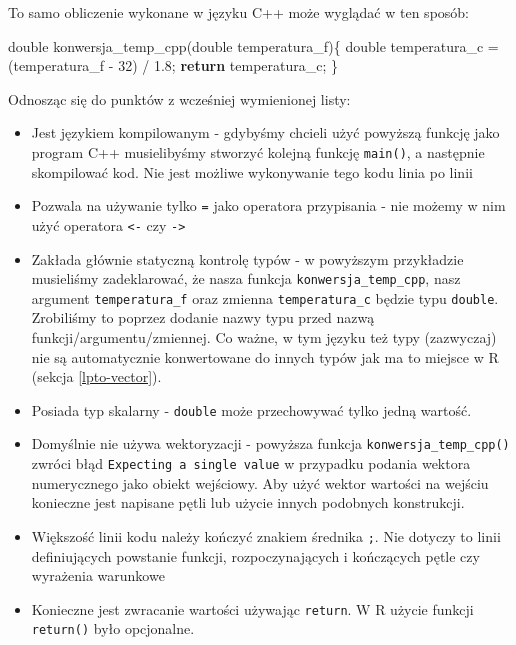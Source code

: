 \documentclass[paper=6in:9in,pagesize=pdftex,headinclude=on,footinclude=on,10pt]{scrbook}
\newenvironment{Shaded}{\begin{snugshade}}{\end{snugshade}}
\newcommand{\ControlFlowTok}[1]{\textcolor[rgb]{0.13,0.29,0.53}{\textbf{#1}}}
\newcommand{\DataTypeTok}[1]{\textcolor[rgb]{0.13,0.29,0.53}{#1}}
\newcommand{\DecValTok}[1]{\textcolor[rgb]{0.00,0.00,0.81}{#1}}
\newcommand{\FloatTok}[1]{\textcolor[rgb]{0.00,0.00,0.81}{#1}}
\newcommand{\NormalTok}[1]{#1}
\providecommand{\tightlist}{%
  \setlength{\itemsep}{0pt}\setlength{\parskip}{0pt}}
\begin{document}
To samo obliczenie wykonane w języku C++ może wyglądać w ten sposób:

\begin{Shaded}
\begin{Highlighting}[]
\DataTypeTok{double}\NormalTok{ konwersja_temp_cpp(}\DataTypeTok{double}\NormalTok{ temperatura_f)\{}
  \DataTypeTok{double}\NormalTok{ temperatura_c = (temperatura_f - }\DecValTok{32}\NormalTok{) / }\FloatTok{1.8}\NormalTok{;}
  \ControlFlowTok{return}\NormalTok{ temperatura_c;}
\NormalTok{\}}
\end{Highlighting}
\end{Shaded}

Odnosząc się do punktów z wcześniej wymienionej listy:

\begin{itemize}
\tightlist
\item
  Jest językiem kompilowanym - gdybyśmy chcieli użyć powyższą funkcję jako program C++ musielibyśmy stworzyć kolejną funkcję \texttt{main()}, a następnie skompilować kod.
  Nie jest możliwe wykonywanie tego kodu linia po linii
\item
  Pozwala na używanie tylko \texttt{=} jako operatora przypisania - nie możemy w nim użyć operatora \texttt{\textless{}-} czy \texttt{-\textgreater{}}
\item
  Zakłada głównie statyczną kontrolę typów - w powyższym przykładzie musieliśmy zadeklarować, że nasza funkcja \texttt{konwersja\_temp\_cpp}, nasz argument \texttt{temperatura\_f} oraz zmienna \texttt{temperatura\_c} będzie typu \texttt{double}. Zrobiliśmy to poprzez dodanie nazwy typu przed nazwą funkcji/argumentu/zmiennej.
  Co ważne, w tym języku też typy (zazwyczaj) nie są automatycznie konwertowane do innych typów jak ma to miejsce w R (sekcja \ref{lpto-vector}).
\item
  Posiada typ skalarny - \texttt{double} może przechowywać tylko jedną wartość.
\item
  Domyślnie nie używa wektoryzacji - powyższa funkcja \texttt{konwersja\_temp\_cpp()} zwróci błąd \texttt{Expecting\ a\ single\ value} w przypadku podania wektora numerycznego jako obiekt wejściowy.
  Aby użyć wektor wartości na wejściu konieczne jest napisane pętli lub użycie innych podobnych konstrukcji.
\item
  Większość linii kodu należy kończyć znakiem średnika \texttt{;}.
  Nie dotyczy to linii definiujących powstanie funkcji, rozpoczynających i kończących pętle czy wyrażenia warunkowe
\item
  Konieczne jest zwracanie wartości używając \texttt{return}.
  W R użycie funkcji \texttt{return()} było opcjonalne.
\end{itemize}
\end{document}
